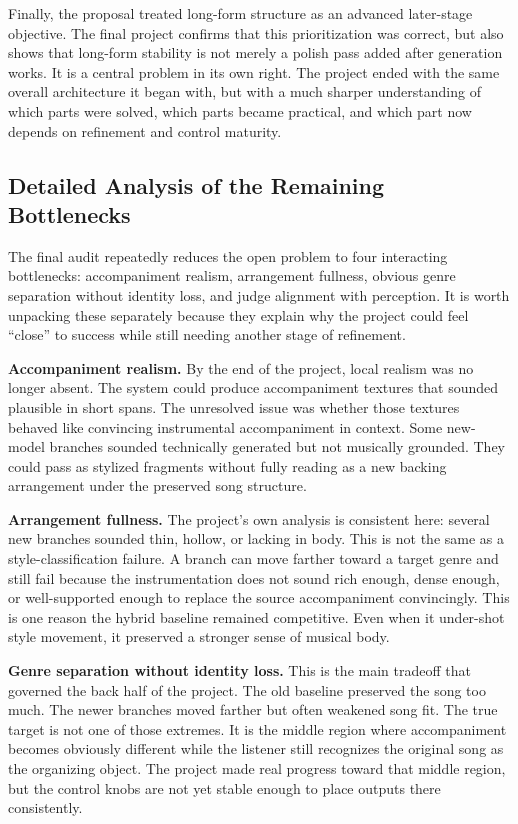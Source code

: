 \documentclass[conference]{IEEEtran}
\begin{document}
Finally, the proposal treated long-form structure as an advanced later-stage objective. The final project confirms that this prioritization was correct, but also shows that long-form stability is not merely a polish pass added after generation works. It is a central problem in its own right. The project ended with the same overall architecture it began with, but with a much sharper understanding of which parts were solved, which parts became practical, and which part now depends on refinement and control maturity.

\subsection{Detailed Analysis of the Remaining Bottlenecks}
The final audit repeatedly reduces the open problem to four interacting bottlenecks: accompaniment realism, arrangement fullness, obvious genre separation without identity loss, and judge alignment with perception. It is worth unpacking these separately because they explain why the project could feel ``close'' to success while still needing another stage of refinement.

\textbf{Accompaniment realism.} By the end of the project, local realism was no longer absent. The system could produce accompaniment textures that sounded plausible in short spans. The unresolved issue was whether those textures behaved like convincing instrumental accompaniment in context. Some new-model branches sounded technically generated but not musically grounded. They could pass as stylized fragments without fully reading as a new backing arrangement under the preserved song structure.

\textbf{Arrangement fullness.} The project's own analysis is consistent here: several new branches sounded thin, hollow, or lacking in body. This is not the same as a style-classification failure. A branch can move farther toward a target genre and still fail because the instrumentation does not sound rich enough, dense enough, or well-supported enough to replace the source accompaniment convincingly. This is one reason the hybrid baseline remained competitive. Even when it under-shot style movement, it preserved a stronger sense of musical body.

\textbf{Genre separation without identity loss.} This is the main tradeoff that governed the back half of the project. The old baseline preserved the song too much. The newer branches moved farther but often weakened song fit. The true target is not one of those extremes. It is the middle region where accompaniment becomes obviously different while the listener still recognizes the original song as the organizing object. The project made real progress toward that middle region, but the control knobs are not yet stable enough to place outputs there consistently.
\end{document}
